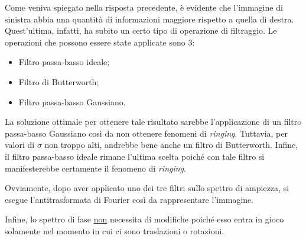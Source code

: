 \documentclass[a4paper]{article}
\begin{document}
	Come veniva spiegato nella risposta precedente, è evidente che l'immagine di sinistra abbia una quantità di informazioni maggiore rispetto a quella di destra. Quest'ultima, infatti, ha subito un certo tipo di operazione di filtraggio. Le operazioni che possono essere state applicate sono 3:
	\begin{itemize}
		\item Filtro passa-basso ideale;
		\item Filtro di Butterworth;
		\item Filtro passa-basso Gaussiano.
	\end{itemize}
	La soluzione ottimale per ottenere tale risultato sarebbe l'applicazione di un filtro passa-basso Gaussiano così da non ottenere fenomeni di \emph{ringing}. Tuttavia, per valori di $\sigma$ non troppo alti, andrebbe bene anche un filtro di Butterworth. Infine, il filtro passa-basso ideale rimane l'ultima scelta poiché con tale filtro si manifesterebbe certamente il fenomeno di \emph{ringing}.
	
	Ovviamente, dopo aver applicato uno dei tre filtri sullo spettro di ampiezza, si esegue l'antitrasformata di Fourier così da rappresentare l'immagine.\newline
	
	\noindent
	Infine, lo spettro di fase \underline{non} necessita di modifiche poiché esso entra in gioco solamente nel momento in cui ci sono traslazioni o rotazioni.
\end{document}
